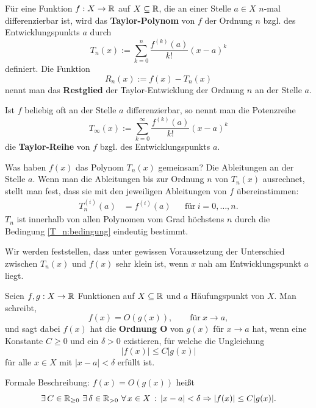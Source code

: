 \begin{defn} 
	Für eine Funktion $f : X \to \mathbb{R}$ auf $X \subseteq \mathbb{R}$, die an einer Stelle $a \in X$ $n$-mal differenzierbar ist, wird das \textbf{Taylor-Polynom} von $f$ der Ordnung $n$ bzgl. des Entwicklungspunkts $a$ durch 
	\[
		T_n(x) := \sum_{k=0}^n \frac{f^{(k)}(a)}{k!} (x-a)^k
	\]
	definiert. Die Funktion 
	\[
		R_n(x) := f(x) - T_n(x)
	\] nennt man das \textbf{Restglied} der Taylor-Entwicklung der Ordnung $n$ an der Stelle $a$. 
	
	Ist $f$ beliebig oft an der Stelle $a$ differenzierbar, so nennt man die Potenzreihe 
	\[
		T_\infty(x) := \sum_{k=0}^\infty \frac{f^{(k)}(a)}{k!} (x-a)^k
	\]
	die \textbf{Taylor-Reihe} von $f$ bzgl. des Entwicklungspunkts $a$. 
\end{defn} 

\begin{bem}
	Was haben $f(x)$ das Polynom $T_n(x)$ gemeinsam? Die Ableitungen an der Stelle $a$. Wenn man die Ableitungen bis zur Ordnung $n$ von $T_n(x)$ ausrechnet, stellt man fest, dass sie mit den jeweiligen Ableitungen von $f$ übereinstimmen: 
	\begin{align} \label{T_n:bedingung} 
		T_n^{(i)}(a) & = f^{(i)}(a)  & & \text{für} \ i=0,\ldots,n.
	\end{align} 
	$T_n$ ist innerhalb von allen Polynomen vom Grad höchstens $n$ durch die Bedingung \eqref{T_n:bedingung} eindeutig bestimmt. 
\end{bem} 


\begin{bem}
	Wir werden feststellen, dass unter gewissen Voraussetzung der Unterschied zwischen $T_n(x)$ und $f(x)$ sehr klein ist, wenn $x$ nah am Entwicklungspunkt $a$ liegt. 
\end{bem} 

\begin{defn}  
	Seien $f,g : X \to \mathbb{R}$ Funktionen auf $X \subseteq \mathbb{R}$ und $a$ Häufungspunkt von $X$. Man schreibt, 
	\[
		f(x) = O(g(x)), \qquad \text{für} \ x \to a,
	\] 
	und sagt dabei $f(x)$ hat die \textbf{Ordnung O} von $g(x)$ für $x \to a$ hat, 
	wenn eine Konstante $C\ge 0$ und ein $\delta > 0$ existieren, für welche die Ungleichung 
	\[
		|f(x)| \le C |g(x)| 
	\]
	für alle $x \in X$ mit $|x-a| < \delta$ erfüllt ist. 
		
	Formale Beschreibung: $f(x) = O(g(x))$ heißt
	\[
		\exists \, C \in \mathbb{R}_{\ge 0} \ \exists \, \delta \in \mathbb{R}_{>0} \ \forall \, x \in X \,:\, |x-a| < \delta \Rightarrow |f(x)| \le C |g(x)|.
	\]
\end{defn} 


